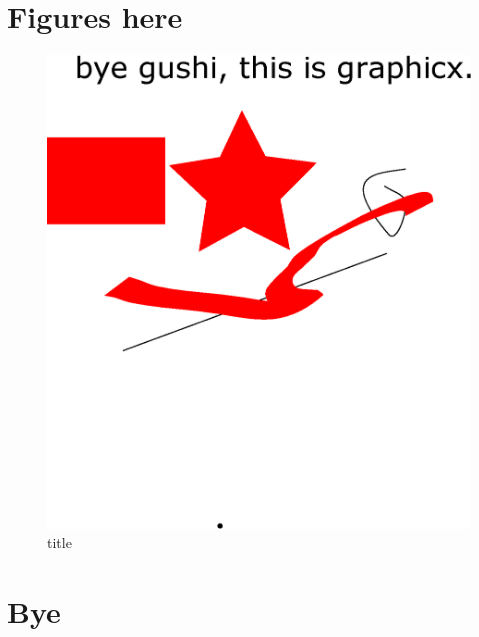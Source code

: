 \documentclass[a4paper,12pt]{article}
\begin{document}
\section{Figures here}
\begin{figure}
\centering
\includegraphics[width=\textwidth]{bye.eps}
\caption{title}
\end{figure}

\section{Bye}

\renewcommand\refname{}
\nocite{*}


\end{document}
